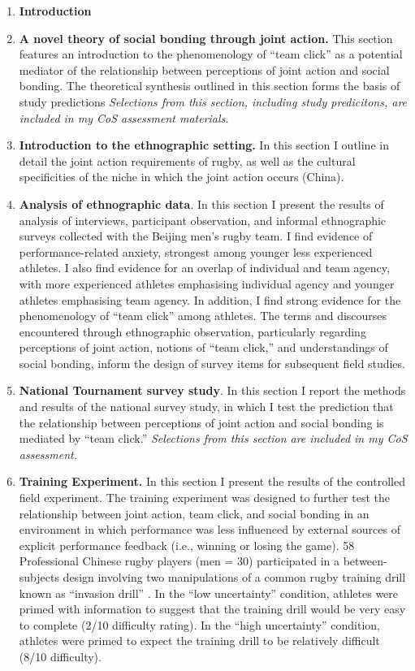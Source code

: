\begin{enumerate}
  \item \textbf{Introduction}
  \item \textbf{A novel theory of social bonding through joint action.}  This section features an introduction to the phenomenology of ``team click'' as a potential mediator of the relationship between perceptions of joint action and social bonding. The theoretical synthesis outlined in this section forms the basis of study predictions \textit{Selections from this section, including study predicitons, are included in my CoS assessment materials.}
  \item \textbf{Introduction to the ethnographic setting.} In this section I outline in detail the joint action requirements of rugby, as well as the cultural specificities of the niche in which the joint action occurs (China).
  \item \textbf{Analysis of ethnographic data}.  In this section I present the results of analysis of interviews, participant observation, and informal ethnographic surveys collected with the Beijing men's rugby team. I find evidence of performance-related anxiety, strongest among younger less experienced athletes. I also find evidence for an overlap of individual and team agency, with more experienced athletes emphasising individual agency and younger athletes emphasising team agency. In addition, I find strong evidence for the phenomenology of ``team click'' among athletes.  The terms and discourses encountered through ethnographic observation, particularly regarding perceptions of joint action, notions of ``team click,'' and understandings of social bonding, inform the design of survey items for subsequent field studies.
  \item \textbf{National Tournament survey study}.  In this section I report the methods and results of the national survey study, in which I test the prediction that the relationship between perceptions of joint action and social bonding is mediated by ``team click.'' \textit{Selections from this section are included in my CoS assessment.}
  \item \textbf{Training Experiment.} In this section I present the results of the controlled field experiment.  The training experiment was designed to further test the relationship between joint action, team click, and social bonding in an environment in which performance was less influenced by external sources of explicit performance feedback (i.e., winning or losing the game).  58 Professional Chinese rugby players (men = 30) participated in a between-subjects design involving two manipulations of a common rugby training drill known as ``invasion drill'' \citep{Passos2011}.  In the ``low uncertainty'' condition, athletes were primed with information to suggest that the training drill would be very easy to complete (2/10 difficulty rating).  In the ``high uncertainty'' condition, athletes were primed to expect the training drill to be relatively difficult (8/10 difficulty).

\end{enumerate}
